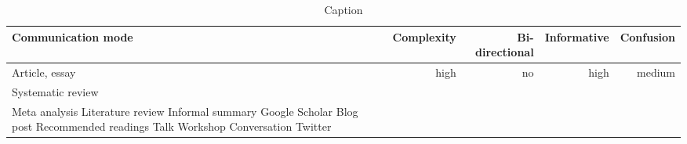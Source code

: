 \begin{table*}\centering
{}
\begin{tabular}{@{}lrrrr@{}}\toprule
Communication mode & Complexity & Bi-directional & Informative  & Confusion
\\\midrule
Article, essay & high & no & high & medium  \\
Systematic review \\
Meta analysis
Literature review
Informal summary
Google Scholar
Blog post
Recommended readings
Talk
Workshop
Conversation
Twitter


\bottomrule
\end{tabular}
\caption{Caption}
\end{table*}